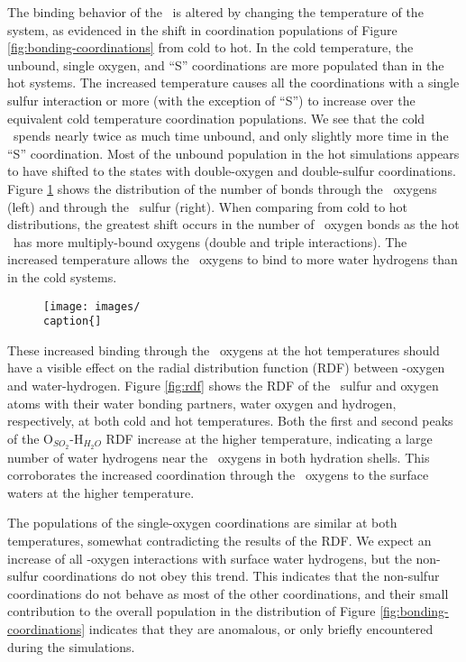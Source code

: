 The binding behavior of the \suldiox~is altered by changing the temperature of the system, as evidenced in the shift in coordination populations of Figure \ref{fig:bonding-coordinations} from cold to hot. In the cold temperature, the unbound, single oxygen, and ``S'' coordinations are more populated than in the hot systems. The increased temperature causes all the coordinations with a single sulfur interaction or more (with the exception of ``S'') to increase over the equivalent cold temperature coordination populations. We see that the cold \suldiox~spends nearly twice as much time unbound, and only slightly more time in the ``S'' coordination. Most of the unbound population in the hot simulations appears to have shifted to the states with double-oxygen and double-sulfur coordinations. Figure \ref{fig:coordination-breakdown} shows the distribution of the number of bonds through the \suldiox~oxygens (left) and through the \suldiox~sulfur (right). When comparing from cold to hot distributions, the greatest shift occurs in the number of \suldiox~oxygen bonds as the hot \suldiox~has more multiply-bound oxygens (double and triple interactions). The increased temperature allows the \suldiox~oxygens to bind to more water hydrogens than in the cold systems.

\begin{figure}[h!]
	\begin{center}
		\texttt{[image: images/
		\\caption\{]}
		\label{fig:coordination-breakdown}
	\end{center}
\end{figure}

These increased binding through the \suldiox~oxygens at the hot temperatures should have a visible effect on the radial distribution function (RDF) between \suldiox-oxygen and water-hydrogen. Figure \ref{fig:rdf} shows the RDF of the \suldiox~sulfur and oxygen atoms with their water bonding partners, water oxygen and hydrogen, respectively, at both cold and hot temperatures. Both the first and second peaks of the O$_{SO_2}$-H$_{H_2O}$ RDF increase at the higher temperature, indicating a large number of water hydrogens near the \suldiox~oxygens in both hydration shells. This corroborates the increased coordination through the \suldiox~oxygens to the surface waters at the higher temperature.

The populations of the single-oxygen coordinations are similar at both temperatures, somewhat contradicting the results of the RDF. We expect an increase of all \suldiox-oxygen interactions with surface water hydrogens, but the non-sulfur coordinations do not obey this trend. This indicates that the non-sulfur coordinations do not behave as most of the other coordinations, and their small contribution to the overall population in the distribution of Figure \ref{fig:bonding-coordinations} indicates that they are anomalous, or only briefly encountered during the simulations.

